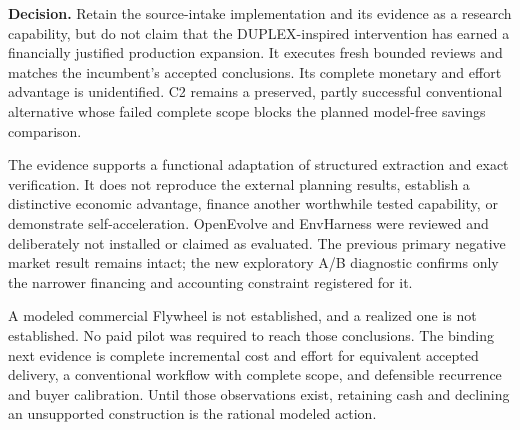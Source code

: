 \textbf{Decision.} Retain the source-intake implementation and its evidence as a research capability, but do not claim that the DUPLEX-inspired intervention has earned a financially justified production expansion. It executes fresh bounded reviews and matches the incumbent's accepted conclusions. Its complete monetary and effort advantage is unidentified. C2 remains a preserved, partly successful conventional alternative whose failed complete scope blocks the planned model-free savings comparison.

The evidence supports a functional adaptation of structured extraction and exact verification. It does not reproduce the external planning results, establish a distinctive economic advantage, finance another worthwhile tested capability, or demonstrate self-acceleration. OpenEvolve and EnvHarness were reviewed and deliberately not installed or claimed as evaluated. The previous primary negative market result remains intact; the new exploratory A/B diagnostic confirms only the narrower financing and accounting constraint registered for it.

A modeled commercial Flywheel is not established, and a realized one is not established. No paid pilot was required to reach those conclusions. The binding next evidence is complete incremental cost and effort for equivalent accepted delivery, a conventional workflow with complete scope, and defensible recurrence and buyer calibration. Until those observations exist, retaining cash and declining an unsupported construction is the rational modeled action.
